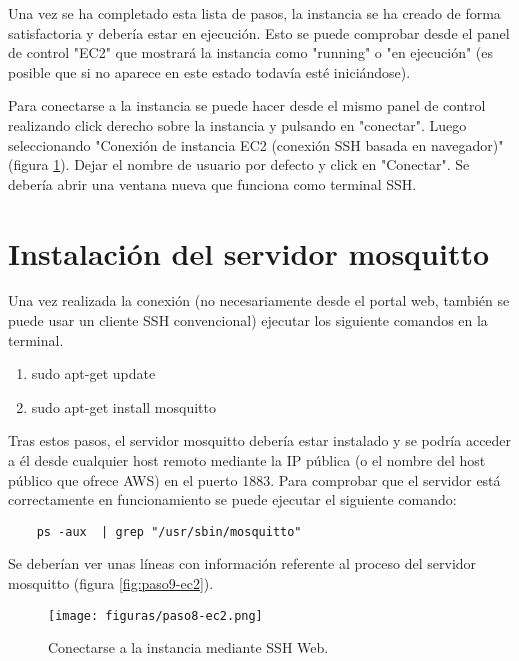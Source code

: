\documentclass{scrbook}
\begin{document}
Una vez se ha completado esta lista de pasos, la instancia se ha creado de forma satisfactoria y debería estar en ejecución. Esto se puede comprobar desde el panel de control "EC2" que mostrará la instancia como "running" o "en ejecución" (es posible que si no aparece en este estado todavía esté iniciándose).

Para conectarse a la instancia se puede hacer desde el mismo panel de control realizando click derecho sobre la instancia y pulsando en "conectar". Luego seleccionando "Conexión de instancia EC2 (conexión SSH basada en navegador)" (figura \ref{fig:paso8-ec2}). Dejar el nombre de usuario por defecto y click en "Conectar". Se debería abrir una ventana nueva que funciona como terminal SSH.

\section{Instalación del servidor mosquitto}
Una vez realizada la conexión (no necesariamente desde el portal web, también se puede usar un cliente SSH convencional) ejecutar los siguiente comandos en la terminal.

\begin{enumerate}
    \item sudo apt-get update
    \item sudo apt-get install mosquitto
\end{enumerate}

Tras estos pasos, el servidor mosquitto debería estar instalado y se podría acceder a él desde cualquier host remoto mediante la IP pública (o el nombre del host público que ofrece AWS) en el puerto 1883. Para comprobar que el servidor está correctamente en funcionamiento se puede ejecutar el siguiente comando:

\begin{verbatim}
    ps -aux  | grep "/usr/sbin/mosquitto"
\end{verbatim}

Se deberían ver unas líneas con información referente al proceso del servidor mosquitto (figura \ref{fig:paso9-ec2}).

\begin{figure}[htb]  
\begin{center}
\label{fig:paso8-ec2}
\texttt{[image: figuras/paso8-ec2.png]}
\caption{Conectarse a la instancia mediante SSH Web.} 
\end{center}
\end{figure}
\end{document}
